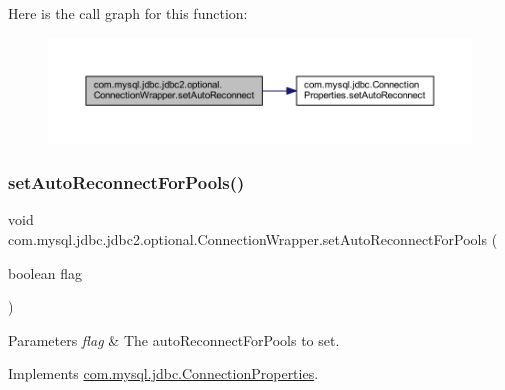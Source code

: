 Here is the call graph for this function\+:
\nopagebreak
\begin{figure}[H]
\begin{center}
\leavevmode
\includegraphics[width=350pt]{classcom_1_1mysql_1_1jdbc_1_1jdbc2_1_1optional_1_1_connection_wrapper_ab60e87c0bf38561dcfae0c6a3524ef27_cgraph}
\end{center}
\end{figure}
\mbox{\label{classcom_1_1mysql_1_1jdbc_1_1jdbc2_1_1optional_1_1_connection_wrapper_ae86cd6b7f7098459fecb312efd62181d}} 
\subsubsection{\texorpdfstring{set\+Auto\+Reconnect\+For\+Pools()}{setAutoReconnectForPools()}}
{\footnotesize\ttfamily void com.\+mysql.\+jdbc.\+jdbc2.\+optional.\+Connection\+Wrapper.\+set\+Auto\+Reconnect\+For\+Pools (\begin{DoxyParamCaption}\item[{boolean}]{flag }\end{DoxyParamCaption})}


\begin{DoxyParams}{Parameters}
{\em flag} & The auto\+Reconnect\+For\+Pools to set. \\
\hline
\end{DoxyParams}


Implements \mbox{\hyperlink{interfacecom_1_1mysql_1_1jdbc_1_1_connection_properties_afd29baec0fcca703af94fac13342e6bf}{com.\+mysql.\+jdbc.\+Connection\+Properties}}.

